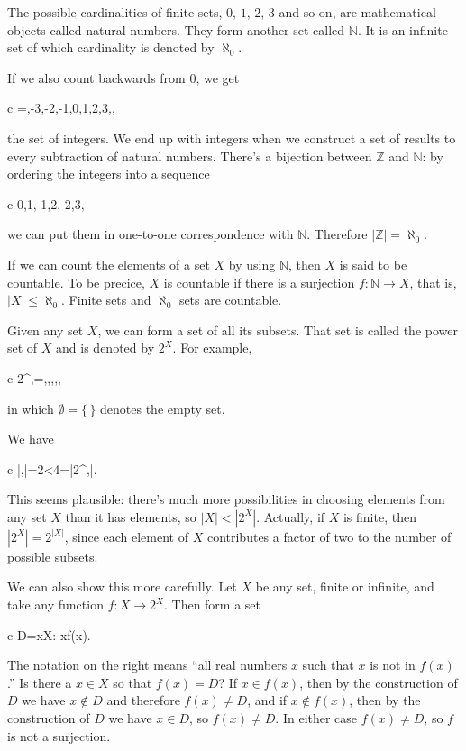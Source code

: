 \documentclass[11pt,oneside,%
]{memoir}
\newenvironment{eqna}{\begin{IEEEeqnarray}{c}}{\end{IEEEeqnarray}\ignorespacesafterend}
\theoremstyle{definition}
\newcommand{\NN}{\mathbb{N}}
\newcommand{\ZZ}{\mathbb{Z}}
\begin{document}
The possible cardinalities of finite sets, \(0\), \(1\), \(2\), \(3\) and so on, are mathematical objects called natural numbers. They form another set called \(\NN\). It is an infinite set of which cardinality is denoted by \(\aleph_0\).

If we also count backwards from \(0\), we get
\begin{eqna}
    \ZZ=\lbrace\dotsc,-3,-2,-1,0,1,2,3,\dotsc\rbrace,
\end{eqna}
the set of integers. We end up with integers when we construct a set of results to every subtraction of natural numbers. There's a bijection between \(\ZZ\) and \(\NN\): by ordering the integers into a sequence
\begin{eqna}
    0,1,-1,2,-2,3,\dotsc
\end{eqna}
we can put them in one-to-one correspondence with \(\NN\). Therefore  \(|\ZZ|=\aleph_0\).

If we can count the elements of a set \(X\) by using \(\NN\), then \(X\) is said to be countable. To be precice, \(X\) is countable if there is a surjection \(f:\NN\rightarrow X\), that is, \(|X|\leq\aleph_0\). Finite sets and \(\aleph_0\) sets are countable.

Given any set \(X\), we can form a set of all its subsets. That set is called the power set of \(X\) and is denoted by \(2^X\). For example,
\begin{eqna}
    2^{\lbrace\uparrow,\downarrow\rbrace}=\lbrace\emptyset,\lbrace\uparrow\rbrace,\lbrace\downarrow\rbrace,\lbrace\uparrow,\downarrow\rbrace\rbrace,
\end{eqna}
in which \(\emptyset=\lbrace\,\rbrace\) denotes the empty set.

We have
\begin{eqna}
    |\lbrace\uparrow,\downarrow\rbrace|=2<4=|2^{\lbrace\uparrow,\downarrow\rbrace}|.
\end{eqna}
This seems plausible: there's much more possibilities in choosing elements from any set \(X\) than it has elements, so \(|X|<|2^X|\). Actually, if \(X\) is finite, then \(|2^X|=2^{|X|}\), since each element of \(X\) contributes a factor of two to the number of possible subsets.

We can also show this more carefully. Let \(X\) be any set, finite or infinite, and take any function \(f:X\rightarrow 2^X\). Then form a set
\begin{eqna}
    D=\lbrace x\in X: x\notin f(x)\rbrace.
\end{eqna}
The notation on the right means ``all real numbers \(x\) such that \(x\) is not in \(f(x)\).'' Is there a \(x\in X\) so that \(f(x)=D\)? If \(x\in f(x)\), then by the construction of \(D\) we have \(x\notin D\) and therefore \(f(x)\neq D\), and if \(x\notin f(x)\), then by the construction of \(D\) we have \(x\in D\), so \(f(x)\neq D\). In either case \(f(x)\neq D\), so \(f\) is not a surjection.
\end{document}
